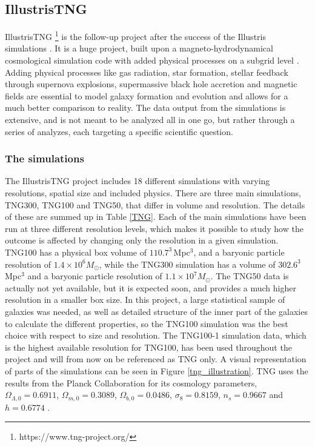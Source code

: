 \subsection{IllustrisTNG}
IllustrisTNG \footnote{https://www.tng-project.org/} is the follow-up project after the success of the Illustris simulations \parencite{Springel2017, Pillepich2017,Naiman2018, Nelson2017, Marinacci2018}. It is a huge project, built upon a magneto-hydrodynamical cosmological simulation code with added physical processes on a subgrid level \parencite{Weinberger2016}. Adding physical processes like gas radiation, star formation, stellar feedback through supernova explosions, supermassive black hole accretion and magnetic fields are essential to model galaxy formation and evolution and allows for a much better comparison to reality. The data output from the simulations is extensive, and is not meant to be analyzed all in one go, but rather through a series of analyzes, each targeting a specific scientific question. 


\subsubsection{The simulations}
The IllustrisTNG project includes 18 different simulations with varying resolutions, spatial size and included physics. There are three main simulations, TNG300, TNG100 and TNG50, that differ in volume and resolution. The details of these are summed up in Table \ref{TNG}. Each of the main simulations have been run at three different resolution levels, which makes it possible to study how the outcome is affected by changing only the resolution in a given simulation. TNG100 has a physical box volume of $110.7^3 \, $Mpc$^3$, and a baryonic particle resolution of $1.4 \times 10^6 M_{\odot}$, while the TNG300 simulation has a volume of $302.6^3 \, $Mpc$^3$ and a baryonic particle resolution of $1.1 \times 10^7 M_{\odot}$. The TNG50 data is actually not yet available, but it is expected soon, and provides a much higher resolution in a smaller box size. In this project, a large statistical sample of galaxies was needed, as well as detailed structure of the inner part of the galaxies to calculate the different properties, so the TNG100 simulation was the best choice with respect to size and resolution. The TNG100-1 simulation data, which is the highest available resolution for TNG100, has been used throughout the project and will from now on be referenced as TNG only. A visual representation of parts of the simulations can be seen in Figure \ref{tng_illustration}. TNG uses the results from the Planck Collaboration for its cosmology parameters, $\Omega_{\Lambda,0} = 0.6911$, $\Omega_{m,0}=0.3089$, $\Omega_{b,0}=0.0486$, $\sigma_8=0.8159$, $n_s=0.9667$ and $h = 0.6774$ \parencite{Planck2016}.

